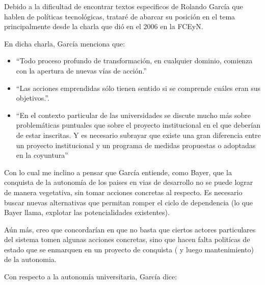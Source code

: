 Debido a la dificultad de encontrar textos especificos de Rolando García que hablen de políticas tecnológicas, trataré de abarcar su posición en el tema principalmente desde la charla que dió en el 2006 en la FCEyN.

En dicha charla, García menciona que:

\begin{itemize}
    \item ``Todo proceso profundo de transformación, en cualquier dominio, comienza con la apertura de nuevas vías de acción.''
    \item ``Las acciones emprendidas sólo tienen sentido si se comprende cuáles eran sus objetivos.''.
    \item ``En el contexto particular de las universidades se discute mucho más sobre problemáticas puntuales que sobre el proyecto institucional en el que deberían de estar inscritas. Y es necesario subrayar que existe una gran diferencia entre un proyecto institucional y un programa de medidas propuestas o adoptadas en la coyuntura''
\end{itemize}

Con lo cual me inclino a pensar que García entiende, como Bayer, que la conquista de la autonomía de los paises en vias de desarrollo no se puede lograr de manera vegetativa, sin tomar acciones concretas al respecto. Es necesario buscar nuevas alternativas que permitan romper el ciclo de dependencia (lo que Bayer llama, explotar las potencialidades existentes).

Aún más, creo que concordarían en que no basta que ciertos actores particulares del sistema tomen algunas acciones concretas, sino que hacen falta politícas de estado que se enmarquen en un proyecto de conquista ( y luego mantenimiento) de la autonomia.

Con respecto a la autonomía universitaria, García dice:

